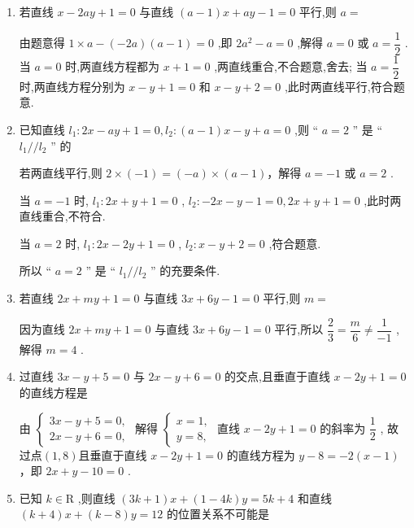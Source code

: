 \begin{enumerate}
    \item 若直线 $x - {2ay} + 1 = 0$ 与直线 $\left( {a - 1}\right) x + {ay} - 1 = 0$ 平行,则 $a =$
    \begin{jieda}
        由题意得 $1 \times  a - \left( {-{2a}}\right) \left( {a - 1}\right)  = 0$ ,即 $2{a}^{2} - a = 0$ ,解得 $a = 0$ 或 $a = \dfrac{1}{2}$ .
        当 $a = 0$ 时,两直线方程都为 $x + 1 = 0$ ,两直线重合,不合题意,舍去;
        当 $a = \dfrac{1}{2}$ 时,两直线方程分别为 $x - y + 1 = 0$ 和 $x - y + 2 = 0$ ,此时两直线平行,符合题意.
    \end{jieda}
    
    \item 已知直线 ${l}_{1} : {2x} - {ay} + 1 = 0,{l}_{2} : \left( {a - 1}\right) x - y + a = 0$ ,则 “ $a = 2$ ” 是 “ ${l}_{1}//{l}_{2}$ ” 的
    \begin{jieda}
        若两直线平行,则 $2 \times  \left( {-1}\right)  = \left( {-a}\right)  \times  \left( {a - 1}\right)$，解得 $a =  - 1$ 或 $a = 2$ .

        当 $a =  - 1$ 时, ${l}_{1} : {2x} + y + 1 = 0$ , ${l}_{2} :  - {2x} - y - 1 = 0,{2x} + y + 1 = 0$ ,此时两直线重合,不符合.

        当 $a = 2$ 时, ${l}_{1} : {2x} - {2y} + 1 = 0$ , ${l}_{2} : x - y + 2 = 0$ ,符合题意.

        所以 “ $a = 2$ ” 是 “ ${l}_{1}//{l}_{2}$ ” 的充要条件.
    \end{jieda}
    \item 若直线 ${2x} + {my} + 1 = 0$ 与直线 ${3x} + {6y} - 1 = 0$ 平行,则 $m = $
    \begin{jieda}
        因为直线 ${2x} + {my} + 1 = 0$ 与直线 ${3x} + {6y} - 1 = 0$ 平行,所以 $\dfrac{2}{3} = \dfrac{m}{6} \neq  \dfrac{1}{-1}$ ,解得 $m = 4$ .
    \end{jieda}

    \item 过直线 ${3x} - y + 5 = 0$ 与 ${2x} - y + 6 = 0$ 的交点,且垂直于直线 $x - {2y} + 1 = 0$ 的直线方程是
    \begin{jieda}
        由 $\left\{  \begin{array}{l} {3x} - y + 5 = 0, \\  {2x} - y + 6 = 0, \end{array}\right.$ 解得 $\left\{  \begin{array}{l} x = 1, \\  y = 8, \end{array}\right.$ 直线 $x - {2y} + 1 = 0$ 的斜率为 $\dfrac{1}{2}$ ,
        故过点$(1,8)$且垂直于直线 $x - {2y} + 1 = 0$ 的直线方程为 $y - 8 =  - 2\left( {x - 1}\right)$，即 ${2x} + y - {10} = 0$ .
    \end{jieda}
    \item 已知 $k \in  \mathrm{R}$ ,则直线 $\left( {{3k} + 1}\right) x + \left( {1 - {4k}}\right) y = {5k} + 4$ 和直线 $\left( {k + 4}\right) x + \left( {k - 8}\right) y = {12}$ 的位置关系不可能是
\end{enumerate}
